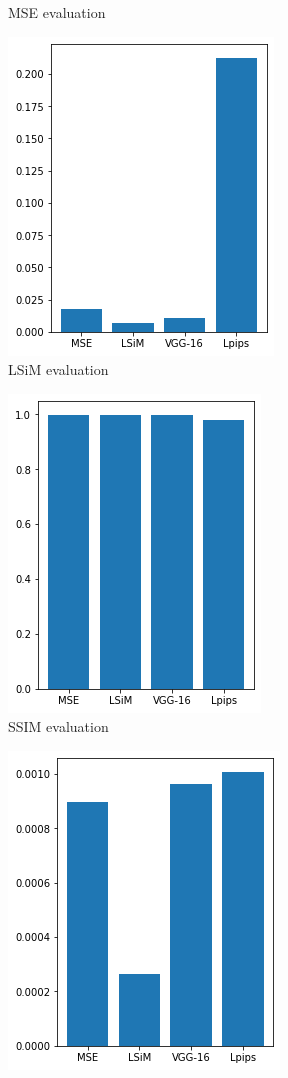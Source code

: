 \documentclass[a4paper,12pt,twoside]{report}
\begin{document}
\begin{figure}
\begin{subfigure}{0.32\textwidth}
		\caption{MSE evaluation}
	\end{subfigure}
	\begin{subfigure}{0.32\textwidth}
		\centering
		\includegraphics[scale=0.48]{superresolution/karman_eval_lsim.png}
		\caption{LSiM evaluation}
	\end{subfigure}
	\begin{subfigure}{0.32\textwidth}
		\centering
		\includegraphics[scale=0.48]{superresolution/karman_eval_ssim.png}
		\caption{SSIM evaluation}
	\end{subfigure}
	\begin{subfigure}{0.32\textwidth}
		\centering
		\includegraphics[scale=0.48]{superresolution/karman_eval_lpips.png}

\end{subfigure}
\end{figure}
\end{document}
